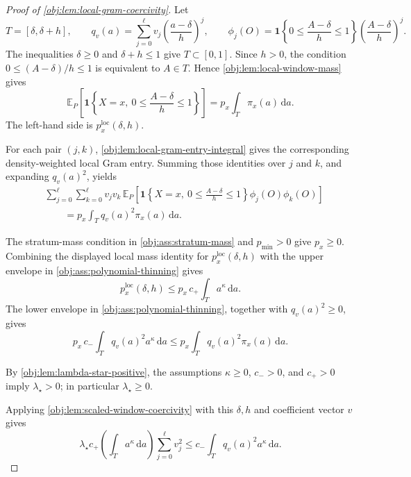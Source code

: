 \documentclass[11pt]{article}
\begin{document}
\begin{proof}[Proof of \cref{obj:lem:local-gram-coercivity}]
Let
\[
        T=[\delta,\delta+h],
        \qquad
        q_v(a)=\sum_{j=0}^{\ell}v_j\left(\frac{a-\delta}{h}\right)^j,
        \qquad
        \phi_j(O)=\mathbf 1\!\left\{0\le\frac{A-\delta}{h}\le1\right\}
        \left(\frac{A-\delta}{h}\right)^j .
\]
The inequalities \(\delta\ge0\) and \(\delta+h\le1\) give \(T\subset[0,1]\).  Since \(h>0\), the condition \(0\le(A-\delta)/h\le1\) is equivalent to \(A\in T\).  Hence \cref{obj:lem:local-window-mass} gives
\[
 \mathbb E_P\!\left[
 \mathbf 1\!\left\{X=x,\ 0\le\frac{A-\delta}{h}\le1\right\}\right]
 =
 p_x\int_T \pi_x(a)\,\mathrm da .
\]
The left-hand side is \(p_x^{\mathrm{loc}}(\delta,h)\).

For each pair \((j,k)\), \cref{obj:lem:local-gram-entry-integral} gives the corresponding density-weighted local Gram entry.  Summing those identities over \(j\) and \(k\), and expanding \(q_v(a)^2\), yields
\[
\begin{aligned}
&\sum_{j=0}^{\ell}\sum_{k=0}^{\ell}
v_jv_k\,
\mathbb E_P\!\left[
\mathbf 1\!\left\{X=x,\ 0\le \frac{A-\delta}{h}\le 1\right\}
\phi_j(O)\phi_k(O)\right]  \\
&\hspace{2em}=
p_x\int_T q_v(a)^2\pi_x(a)\,\mathrm da .
\end{aligned}
\]

The stratum-mass condition in \cref{obj:ass:stratum-mass} and \(p_{\min}>0\) give \(p_x\ge0\).  Combining the displayed local mass identity for \(p_x^{\mathrm{loc}}(\delta,h)\) with the upper envelope in \cref{obj:ass:polynomial-thinning} gives
\[
        p_x^{\mathrm{loc}}(\delta,h)
        \le
        p_x\,c_+\int_T a^\kappa\,\mathrm da .
\]
The lower envelope in \cref{obj:ass:polynomial-thinning}, together with \(q_v(a)^2\ge0\), gives
\[
        p_x\,c_-\int_T q_v(a)^2a^\kappa\,\mathrm da
        \le
        p_x\int_T q_v(a)^2\pi_x(a)\,\mathrm da .
\]

By \cref{obj:lem:lambda-star-positive}, the assumptions \(\kappa\ge0\), \(c_->0\), and \(c_+>0\) imply \(\lambda_\star>0\); in particular \(\lambda_\star\ge0\).

Applying \cref{obj:lem:scaled-window-coercivity} with this \(\delta,h\) and coefficient vector \(v\) gives
\[
 \lambda_\star c_+\!\left(\int_T a^\kappa\,\mathrm da\right)
 \sum_{j=0}^{\ell}v_j^2
 \le
 c_-\int_T q_v(a)^2a^\kappa\,\mathrm da .
\]


\end{proof}
\end{document}
